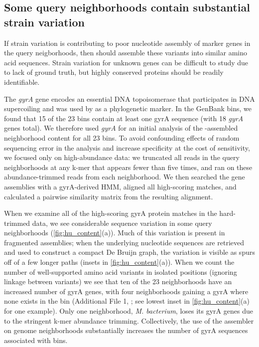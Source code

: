 \subsection*{Some query neighborhoods contain substantial strain variation}

If strain variation is contributing to poor nucleotide assembly of
marker genes in the query neigborhoods, then \plass should
assemble these variants into similar amino acid sequences.
Strain variation for unknown genes can be difficult to study due to
lack of ground truth, but highly conserved proteins should be readily
identifiable.

The {\em gyrA} gene encodes an essential DNA topoisomerase that
participates in DNA supercoiling and was used by \cite{Hu2016} as a
phylogenetic marker.  In the GenBank bins, we found that 15 of the 23
bins contain at least one gyrA sequence (with 18 {\em gyrA} genes
total).  We therefore used {\em gyrA} for an initial analysis of the
\plass-assembled neighborhood content for all 23 bins.  To avoid confounding effects of
random sequencing error in the analysis and increase specificity at the
cost of sensitivity, we focused only on high-abundance data:
we truncated all reads
in the query neighborhoods at any k-mer that appears fewer than five
times, and ran \plass on these abundance-trimmed reads from each
neighborhood.  We then searched the gene assemblies with a gyrA-derived
HMM, aligned all high-scoring matches, and calculated a pairwise similarity
matrix from the resulting alignment.

When we examine all of the high-scoring gyrA protein matches in the
hard-trimmed data, we see
considerable sequence variation in some query neighborhoods
(\autoref{fig:hu_content}(a)). Much of this variation is present in
fragmented \plass assemblies; when the underlying nucleotide sequences
are retrieved and used to construct a compact De Bruijn graph, the
variation is visible as spurs off of a few longer paths (insets in
\autoref{fig:hu_content}(a)). When we count the number of
well-supported amino acid variants in isolated positions (\ie ignoring linkage between variants)
we see that ten of the 23 neighborhoods have an increased number of gyrA
genes, with four neighborhoods gaining a gyrA where none exists in
the bin (Additional File 1, ; see lowest inset
in \autoref{fig:hu_content}(a) for one example). Only one
neighborhood, {\em M. bacterium}, loses its gyrA genes due to the
stringent k-mer abundance trimming.
Collectively, the use of the \plass assembler on genome
neighborhoods substantially increases the number of gyrA sequences associated with bins.

